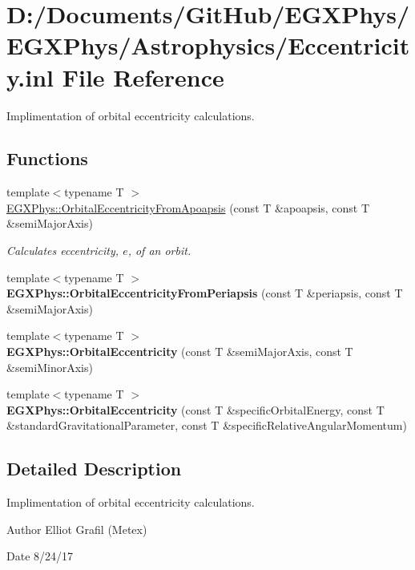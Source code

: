 \hypertarget{_eccentricity_8inl}{}\section{D\+:/\+Documents/\+Git\+Hub/\+E\+G\+X\+Phys/\+E\+G\+X\+Phys/\+Astrophysics/\+Eccentricity.inl File Reference}
\label{_eccentricity_8inl}


Implimentation of orbital eccentricity calculations.  


\subsection*{Functions}
\begin{DoxyCompactItemize}
\item 
{\footnotesize template$<$typename T $>$ }\\\hyperlink{group___e_g_x_phys-_eccentricity_gad0a4e49f20aeb01bd7d4c6b6171f7732}{E\+G\+X\+Phys\+::\+Orbital\+Eccentricity\+From\+Apoapsis} (const T \&apoapsis, const T \&semi\+Major\+Axis)
\begin{DoxyCompactList}\small\item\em Calculates eccentricity, $e$, of an orbit. \end{DoxyCompactList}\item 
{\footnotesize template$<$typename T $>$ }\\{\bfseries E\+G\+X\+Phys\+::\+Orbital\+Eccentricity\+From\+Periapsis} (const T \&periapsis, const T \&semi\+Major\+Axis)
\item 
{\footnotesize template$<$typename T $>$ }\\{\bfseries E\+G\+X\+Phys\+::\+Orbital\+Eccentricity} (const T \&semi\+Major\+Axis, const T \&semi\+Minor\+Axis)
\item 
{\footnotesize template$<$typename T $>$ }\\{\bfseries E\+G\+X\+Phys\+::\+Orbital\+Eccentricity} (const T \&specific\+Orbital\+Energy, const T \&standard\+Gravitational\+Parameter, const T \&specific\+Relative\+Angular\+Momentum)
\end{DoxyCompactItemize}


\subsection{Detailed Description}
Implimentation of orbital eccentricity calculations. 

\begin{DoxyAuthor}{Author}
Elliot Grafil (Metex) 
\end{DoxyAuthor}
\begin{DoxyDate}{Date}
8/24/17 
\end{DoxyDate}
